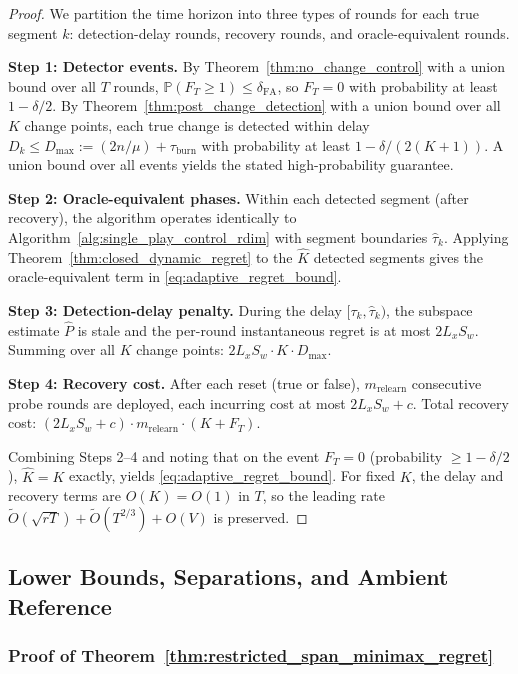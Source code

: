 \documentclass{article}
\newcommand{\Prob}{\mathbb{P}}
\begin{document}
\begin{proof}
We partition the time horizon into three types of rounds for each true segment $k$: detection-delay rounds, recovery rounds, and oracle-equivalent rounds.

\textbf{Step 1: Detector events.}
By Theorem~\ref{thm:no_change_control} with a union bound over all $T$ rounds, $\Prob(F_T \ge 1) \le \delta_{\mathrm{FA}}$, so $F_T = 0$ with probability at least $1-\delta/2$.
By Theorem~\ref{thm:post_change_detection} with a union bound over all $K$ change points, each true change is detected within delay $D_k \le D_{\max} := (2n/\mu) + \tau_{\mathrm{burn}}$ with probability at least $1-\delta/(2(K+1))$.
A union bound over all events yields the stated high-probability guarantee.

\textbf{Step 2: Oracle-equivalent phases.}
Within each detected segment (after recovery), the algorithm operates identically to Algorithm~\ref{alg:single_play_control_rdim} with segment boundaries $\hat\tau_k$.
Applying Theorem~\ref{thm:closed_dynamic_regret} to the $\hat K$ detected segments gives the oracle-equivalent term in \eqref{eq:adaptive_regret_bound}.

\textbf{Step 3: Detection-delay penalty.}
During the delay $[\tau_k, \hat\tau_k)$, the subspace estimate $\widehat P$ is stale and the per-round instantaneous regret is at most $2L_xS_w$.
Summing over all $K$ change points: $2L_xS_w \cdot K \cdot D_{\max}$.

\textbf{Step 4: Recovery cost.}
After each reset (true or false), $m_{\mathrm{relearn}}$ consecutive probe rounds are deployed, each incurring cost at most $2L_xS_w + c$.
Total recovery cost: $(2L_xS_w + c) \cdot m_{\mathrm{relearn}} \cdot (K + F_T)$.

Combining Steps 2--4 and noting that on the event $F_T = 0$ (probability $\ge 1-\delta/2$), $\hat K = K$ exactly, yields \eqref{eq:adaptive_regret_bound}.
For fixed $K$, the delay and recovery terms are $O(K) = O(1)$ in $T$, so the leading rate $\widetilde O(\sqrt{rT}) + \widetilde O(T^{2/3}) + O(V)$ is preserved.
\end{proof}

\subsection{Lower Bounds, Separations, and Ambient Reference}

\subsubsection{Proof of Theorem~\ref{thm:restricted_span_minimax_regret}}
\label{proof:restricted_span_minimax_regret}
\end{document}
